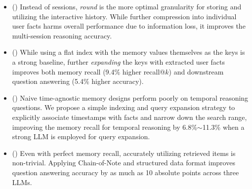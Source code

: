 \begin{itemize}
    \item () Instead of sessions, \textit{round} is the more optimal granularity for storing and utilizing the interactive history. While further compression into individual user facts harms overall performance due to information loss, it improves the multi-session reasoning accuracy. 
    \item () While using a flat index with the memory values themselves as the keys is a strong baseline, further \textit{expanding} the keys with extracted user facts improves both memory recall {(9.4\% higher recall@$k$) and downstream question answering (5.4\% higher accuracy}). 
    \item () Naive time-agnostic memory designs perform poorly on temporal reasoning questions. We propose a simple indexing and query expansion strategy to explicitly associate timestamps with facts and narrow down the search range, improving the memory recall for temporal reasoning {by 6.8\%$\sim$11.3\% when a strong LLM is employed for query expansion}.  
    \item () Even with perfect memory recall, accurately utilizing retrieved items is non-trivial. Applying Chain-of-Note \citep{yu2023chain} and structured data format \citep{yin-etal-2023-read} improves question answering accuracy by as much as 10 absolute points across three LLMs.
\end{itemize}
